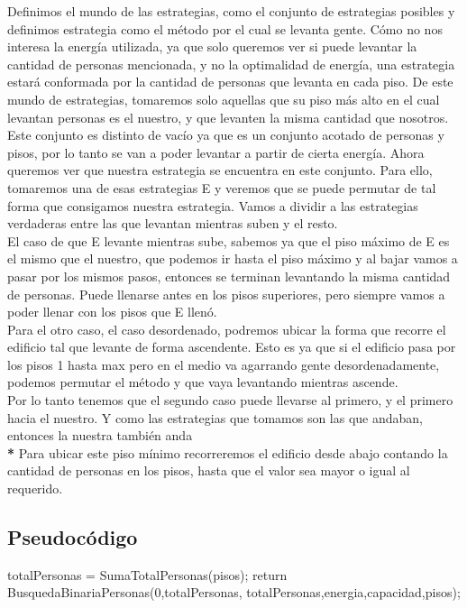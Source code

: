 Definimos el mundo de las estrategias, como el conjunto de estrategias posibles y definimos estrategia como el método por el cual se levanta gente. Cómo no nos interesa
la energía utilizada, ya que solo queremos ver si puede levantar la cantidad de personas mencionada, y no la optimalidad de energía, una estrategia estará conformada por la cantidad
de personas que levanta en cada piso. De este mundo de estrategias, tomaremos solo aquellas que su piso más alto en el cual levantan personas es el nuestro, y que
levanten la misma cantidad que nosotros. Este conjunto es distinto de vacío ya que es un conjunto acotado de personas y pisos, por lo tanto se van a poder levantar a partir de
cierta energía. Ahora queremos ver que nuestra estrategia se encuentra en este conjunto. Para ello, tomaremos una de esas estrategias E y veremos que se puede permutar de tal
forma que consigamos nuestra estrategia. Vamos a dividir a las estrategias verdaderas entre las que levantan mientras suben y el resto.\\
El caso de que E levante mientras sube, sabemos ya que el piso máximo de E es el mismo que 
el nuestro, que podemos ir hasta el piso máximo y al bajar vamos a pasar por los mismos pasos, entonces se terminan levantando la misma cantidad de personas. Puede llenarse antes en los pisos superiores, pero siempre vamos a poder
llenar con los pisos que E llenó.\\
Para el otro caso, el caso desordenado, podremos ubicar la forma que recorre el edificio tal que levante de forma ascendente. Esto es ya que si el edificio pasa por los pisos 1 hasta max pero en el medio va agarrando gente
desordenadamente, podemos permutar el método y que vaya levantando mientras ascende. \\
Por lo tanto tenemos que el segundo caso puede llevarse al primero, y el primero hacia el nuestro. Y como las estrategias que tomamos son las que andaban, entonces la nuestra también anda\\

\footnotesize {\textbf{*} Para ubicar este piso mínimo recorreremos el edificio desde abajo contando la cantidad de personas en los pisos, hasta que el valor sea mayor o igual al requerido.}

\subsection{Pseudoc\'odigo}
\begin{codebox}
\li		totalPersonas = SumaTotalPersonas(pisos);
\li		return BusquedaBinariaPersonas(0,totalPersonas, totalPersonas,energia,capacidad,pisos);
\end{codebox}

